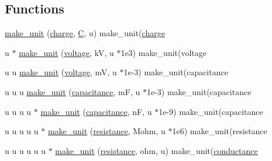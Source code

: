 \subsection*{Functions}
\begin{DoxyCompactItemize}
\item 
\hyperlink{namespacemui_1_1dim_1_1electrical_ac636ae6cfce6a3b0764e2a092894c587}{make\+\_\+unit} (\hyperlink{namespacemui_1_1dim_1_1electrical_acd4b8cce75196ce05ff2879941d870df}{charge}, \hyperlink{namespacemui_1_1dim_a819cc406ce7c3b35bd3bbd6724ff8d42}{C}, u) make\+\_\+unit(\hyperlink{namespacemui_1_1dim_1_1electrical_acd4b8cce75196ce05ff2879941d870df}{charge}
\item 
u $\ast$ \hyperlink{namespacemui_1_1dim_1_1electrical_a9f531023bc12ae2ed2b2abc706fc49e0}{make\+\_\+unit} (\hyperlink{namespacemui_1_1dim_1_1electrical_a028fd928ac1e20226332a4e793bac739}{voltage}, kV, u $\ast$1e3) make\+\_\+unit(voltage
\item 
u u \hyperlink{namespacemui_1_1dim_1_1electrical_ab16879044755cf6b4aeeb08ddbb3016a}{make\+\_\+unit} (\hyperlink{namespacemui_1_1dim_1_1electrical_a028fd928ac1e20226332a4e793bac739}{voltage}, mV, u $\ast$1e-\/3) make\+\_\+unit(capacitance
\item 
u u u \hyperlink{namespacemui_1_1dim_1_1electrical_ab3734282a892299ddd5cd1e5b7a05229}{make\+\_\+unit} (\hyperlink{namespacemui_1_1dim_1_1electrical_ab6fce13543150792566ab8449ce7ef0e}{capacitance}, mF, u $\ast$1e-\/3) make\+\_\+unit(capacitance
\item 
u u u u $\ast$ \hyperlink{namespacemui_1_1dim_1_1electrical_a5620ea45fe073731f50f6b12b8779bf3}{make\+\_\+unit} (\hyperlink{namespacemui_1_1dim_1_1electrical_ab6fce13543150792566ab8449ce7ef0e}{capacitance}, nF, u $\ast$1e-\/9) make\+\_\+unit(capacitance
\item 
u u u u u $\ast$ \hyperlink{namespacemui_1_1dim_1_1electrical_aa5e26d2e47e3442aa83657b98e4098d7}{make\+\_\+unit} (\hyperlink{namespacemui_1_1dim_1_1electrical_a86a4b6ba2ef40975afac4dd629e07d3b}{resistance}, Mohm, u $\ast$1e6) make\+\_\+unit(resistance
\item 
u u u u u u $\ast$ \hyperlink{namespacemui_1_1dim_1_1electrical_a5904c845f3ffb933619767cbb53b7a89}{make\+\_\+unit} (\hyperlink{namespacemui_1_1dim_1_1electrical_a86a4b6ba2ef40975afac4dd629e07d3b}{resistance}, ohm, u) make\+\_\+unit(\hyperlink{namespacemui_1_1dim_1_1electrical_a575b190ccda32c3b901b8fd44249c62e}{conductance}
\end{DoxyCompactItemize}
